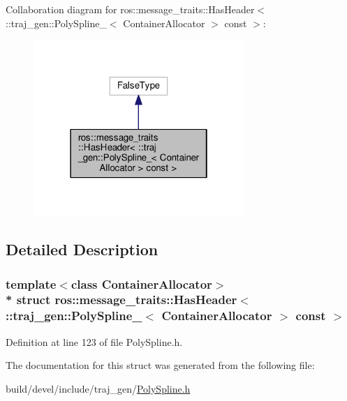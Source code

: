 Collaboration diagram for ros\+:\+:message\+\_\+traits\+:\+:Has\+Header$<$ \+:\+:traj\+\_\+gen\+:\+:Poly\+Spline\+\_\+$<$ Container\+Allocator $>$ const $>$\+:
\nopagebreak
\begin{figure}[H]
\begin{center}
\leavevmode
\includegraphics[width=226pt]{structros_1_1message__traits_1_1_has_header_3_01_1_1traj__gen_1_1_poly_spline___3_01_container_ab568bdcd624e6eff71fd54011c74493f}
\end{center}
\end{figure}


\subsection{Detailed Description}
\subsubsection*{template$<$class Container\+Allocator$>$\\*
struct ros\+::message\+\_\+traits\+::\+Has\+Header$<$ \+::traj\+\_\+gen\+::\+Poly\+Spline\+\_\+$<$ Container\+Allocator $>$ const  $>$}



Definition at line 123 of file Poly\+Spline.\+h.



The documentation for this struct was generated from the following file\+:\begin{DoxyCompactItemize}
\item 
build/devel/include/traj\+\_\+gen/\hyperlink{_poly_spline_8h}{Poly\+Spline.\+h}\end{DoxyCompactItemize}
